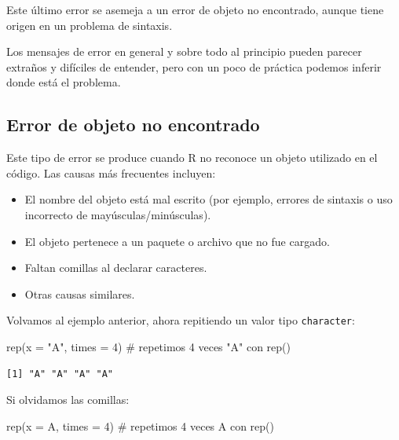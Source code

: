 \documentclass[
  spanish,
  letterpaper,
  DIV=11,
  numbers=noendperiod]{scrreprt}
\newenvironment{Shaded}{\begin{snugshade}}{\end{snugshade}}
\newcommand{\AttributeTok}[1]{\textcolor[rgb]{0.40,0.45,0.13}{#1}}
\newcommand{\CommentTok}[1]{\textcolor[rgb]{0.37,0.37,0.37}{#1}}
\newcommand{\DecValTok}[1]{\textcolor[rgb]{0.68,0.00,0.00}{#1}}
\newcommand{\FunctionTok}[1]{\textcolor[rgb]{0.28,0.35,0.67}{#1}}
\newcommand{\NormalTok}[1]{\textcolor[rgb]{0.00,0.23,0.31}{#1}}
\newcommand{\StringTok}[1]{\textcolor[rgb]{0.13,0.47,0.30}{#1}}
\begin{document}
Este último error se asemeja a un error de objeto no encontrado, aunque
tiene origen en un problema de sintaxis.

Los mensajes de error en general y sobre todo al principio pueden
parecer extraños y difíciles de entender, pero con un poco de práctica
podemos inferir donde está el problema.

\subsection{Error de objeto no
encontrado}\label{error-de-objeto-no-encontrado}

Este tipo de error se produce cuando R no reconoce un objeto utilizado
en el código. Las causas más frecuentes incluyen:

\begin{itemize}
\item
  El nombre del objeto está mal escrito (por ejemplo, errores de
  sintaxis o uso incorrecto de mayúsculas/minúsculas).
\item
  El objeto pertenece a un paquete o archivo que no fue cargado.
\item
  Faltan comillas al declarar caracteres.
\item
  Otras causas similares.
\end{itemize}

Volvamos al ejemplo anterior, ahora repitiendo un valor tipo
\texttt{character}:

\begin{Shaded}
\begin{Highlighting}[]
\FunctionTok{rep}\NormalTok{(}\AttributeTok{x =} \StringTok{"A"}\NormalTok{, }\AttributeTok{times =} \DecValTok{4}\NormalTok{) }\CommentTok{\# repetimos 4 veces "A" con rep()}
\end{Highlighting}
\end{Shaded}

\begin{verbatim}
[1] "A" "A" "A" "A"
\end{verbatim}

Si olvidamos las comillas:

\begin{Shaded}
\begin{Highlighting}[]
\FunctionTok{rep}\NormalTok{(}\AttributeTok{x =}\NormalTok{ A, }\AttributeTok{times =} \DecValTok{4}\NormalTok{) }\CommentTok{\# repetimos 4 veces A con rep()}
\end{Highlighting}
\end{Shaded}
\end{document}
